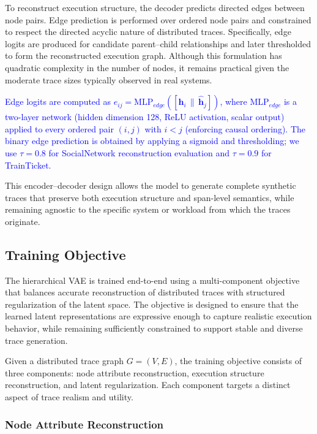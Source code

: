 \documentclass[sigconf,review]{acmart}
\begin{document}
To reconstruct execution structure, the decoder predicts directed edges between node pairs. Edge prediction is performed over ordered node pairs and constrained to respect the directed acyclic nature of distributed traces. Specifically, edge logits are produced for candidate parent--child relationships and later thresholded to form the reconstructed execution graph. Although this formulation has quadratic complexity in the number of nodes, it remains practical given the moderate trace sizes typically observed in real systems.

\textcolor{blue}{Edge logits are computed as $e_{ij} = \text{MLP}_{edge}([\hat{\mathbf{h}}_i \,\|\, \hat{\mathbf{h}}_j])$, where $\text{MLP}_{edge}$ is a two-layer network (hidden dimension 128, ReLU activation, scalar output) applied to every ordered pair $(i,j)$ with $i < j$ (enforcing causal ordering). The binary edge prediction is obtained by applying a sigmoid and thresholding; we use $\tau=0.8$ for SocialNetwork reconstruction evaluation and $\tau=0.9$ for TrainTicket.}

This encoder--decoder design allows the model to generate complete synthetic traces that preserve both execution structure and span-level semantics, while remaining agnostic to the specific system or workload from which the traces originate.




\subsection{Training Objective}
\label{sec:training}

The hierarchical VAE is trained end-to-end using a multi-component objective that balances accurate reconstruction of distributed traces with structured regularization of the latent space. The objective is designed to ensure that the learned latent representations are expressive enough to capture realistic execution behavior, while remaining sufficiently constrained to support stable and diverse trace generation.

Given a distributed trace graph $G = (V, E)$, the training objective consists of three components: node attribute reconstruction, execution structure reconstruction, and latent regularization. Each component targets a distinct aspect of trace realism and utility.

\subsubsection{Node Attribute Reconstruction}
\end{document}
